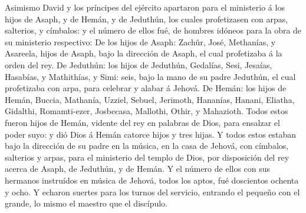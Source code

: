  Asimismo David y los príncipes del ejército apartaron
para el ministerio á los hijos de Asaph, y de Hemán, y de Jeduthún, los
cuales profetizasen con arpas, salterios, y címbalos: y el número de
ellos fué, de hombres idóneos para la obra de su ministerio respectivo:
 De los hijos de Asaph: Zachûr, José, Methanías, y
Asareela, hijos de Asaph, bajo la dirección de Asaph, el cual
profetizaba á la orden del rey.  De Jeduthún: los hijos de
Jeduthún, Gedalías, Sesi, Jesaías, Hasabías, y Mathithías, y Simi: seis,
bajo la mano de su padre Jeduthún, el cual profetizaba con arpa, para
celebrar y alabar á Jehová.  De Hemán: los hijos de Hemán,
Buccia, Mathanía, Uzziel, Sebuel, Jerimoth, Hananías, Hanani, Eliatha,
Gidalthi, Romamti-ezer, Josbecasa, Mallothi, Othir, y Mahazioth.
 Todos estos fueron hijos de Hemán, vidente del rey en
palabras de Dios, para ensalzar el poder suyo: y dió Dios á Hemán
catorce hijos y tres hijas.  Y todos estos estaban bajo la
dirección de su padre en la música, en la casa de Jehová, con címbalos,
salterios y arpas, para el ministerio del templo de Dios, por
disposición del rey acerca de Asaph, de Jeduthún, y de Hemán.
 Y el número de ellos con sus hermanos instruídos en
música de Jehová, todos los aptos, fué doscientos ochenta y ocho.
 Y echaron suertes para los turnos del servicio, entrando
el pequeño con el grande, lo mismo el maestro que el discípulo.

